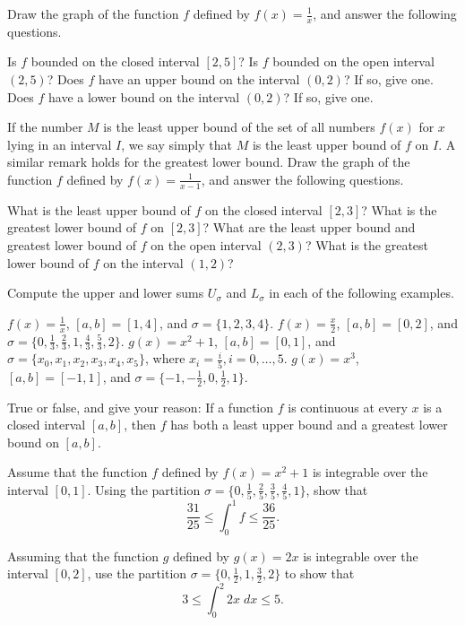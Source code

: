 
Draw the graph of the function $f$ defined by
$f(x) = \frac1x$,
and answer the following questions.
\begin{exenum}
\x
Is $f$ bounded on the closed interval $[2,5]$?
\x
Is $f$ bounded on the open interval $(2,5)$?
\x
Does $f$ have an upper bound on the interval $(0,2)$?
If so, give one.
\x
Does $f$ have a lower bound on the interval $(0,2)$?
If so, give one.
\end{exenum}

If the number $M$ is the least upper bound of the set
of all numbers $f(x)$ for $x$ lying in an interval $I$,
we say simply that $M$ is the least upper bound
of $f$ on $I$.
A similar remark holds for the greatest lower bound.
Draw the graph of the function $f$ defined by
$f(x) = \frac1{x-1}$, and answer the following questions.
\begin{exenum}
\x
What is the least upper bound of $f$ on the closed interval
$[2,3]$?
\x
What is the greatest lower bound of $f$ on $[2,3]$?
\x
What are the least upper bound and greatest lower bound
of $f$ on the open interval $(2,3)$?
\x
What is the greatest lower bound of $f$ on the interval
$(1,2)$?
\end{exenum}

Compute the upper and lower sums $U_\sigma$ and $L_\sigma$
in each of the following examples.
\begin{exenum}
\x
$f(x) = \frac1x$, $[a,b] = [1,4]$, and
$\sigma = \{1,2,3,4\}$.
\x
$f(x) = \frac x2$, $[a,b] = [0,2]$, and
$\sigma = \{0, \frac13, \frac23, 1, \frac43, \frac53, 2\}$.
\x
$g(x) = x^2 + 1$, $[a,b] = [0,1]$, and
$\sigma = \{x_0,x_1,x_2,x_3,x_4,x_5\}$,
where $x_i = \frac i5, i = 0, \ldots, 5$.
\x
$g(x) = x^3$, $[a,b] = [-1,1]$, and
$\sigma = \{-1, -\frac12, 0, \frac12, 1\}$.
\end{exenum}

True or false, and give your reason:
If a function $f$ is continuous at every $x$ is a
closed interval $[a,b]$, then $f$ has both a least upper
bound and a greatest lower bound on $[a,b]$.

Assume that the function $f$ defined by
$f(x) = x^2 + 1$ is integrable over the interval $[0,1]$.
Using the partition
$\sigma = \{0, \frac15, \frac25, \frac35, \frac45, 1\}$,
show that
\[
\frac{31}{25} \leq \int_0^1 f \leq \frac{36}{25}
.
\]

Assuming that the function $g$ defined by $g(x) = 2x$
is integrable over the interval $[0,2]$, use the partition
$\sigma = \{0, \frac12, 1, \frac32, 2\}$ to show that
\[
3 \leq \int_0^2 2x\;dx \leq 5
.
\]

